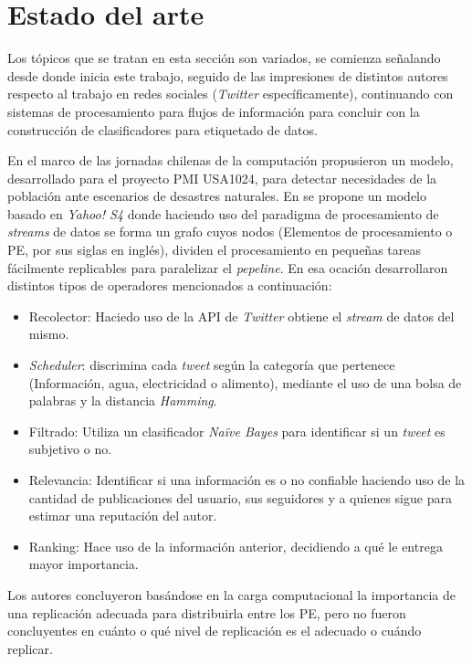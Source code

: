 \section{Estado del arte}
\label{intro:motivacion:arte}

Los tópicos que se tratan en esta sección son variados, se comienza señalando desde donde inicia este trabajo, seguido de las impresiones de distintos autores respecto al trabajo en redes sociales (\textit{Twitter} específicamente), continuando con sistemas de procesamiento para flujos de información para concluir con la construcción de clasificadores para etiquetado de datos.

En el marco de las jornadas chilenas de la computación \cite{WladdimiroPMI} propusieron un modelo, desarrollado para el proyecto PMI USA1024, para detectar necesidades de la población ante escenarios de desastres naturales. En se propone un modelo basado en \textit{Yahoo! S4} donde haciendo uso del paradigma de procesamiento de \textit{streams} de datos se forma un grafo cuyos nodos (Elementos de procesamiento o PE, por sus siglas en inglés), dividen el procesamiento en pequeñas tareas fácilmente replicables para paralelizar el \textit{pepeline}. En esa ocación desarrollaron distintos tipos de operadores mencionados a continuación:

\begin{itemize}
\item Recolector: Haciedo uso de la API de \textit{Twitter} obtiene el \textit{stream} de datos del mismo. 
\item \textit{Scheduler}: discrimina cada \textit{tweet} según la categoría que pertenece (Información, agua, electricidad o alimento), mediante el uso de una bolsa de palabras y la distancia \textit{Hamming}.
\item Filtrado: Utiliza un clasificador \textit{Naïve Bayes} para identificar si un \textit{tweet} es subjetivo o no.
\item Relevancia: Identificar si una información es o no confiable haciendo uso de la cantidad de publicaciones del usuario, sus seguidores y a quienes sigue para estimar una reputación del autor.
\item Ranking: Hace uso de la información anterior, decidiendo a qué le entrega mayor importancia.
\end{itemize}

Los autores concluyeron basándose en la carga computacional la importancia de una replicación adecuada para distribuirla entre los PE, pero no fueron concluyentes en cuánto o qué nivel de replicación es el adecuado o cuándo replicar.

